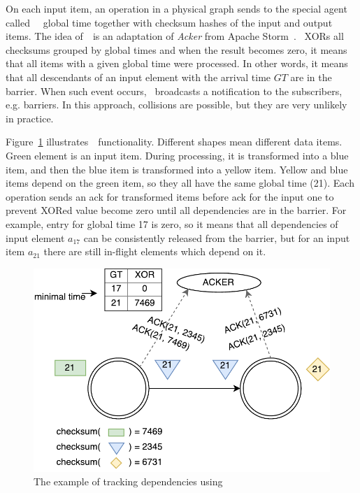 On each input item, an operation in a physical graph sends to the special agent called~{\em \Acker\ } global time together with checksum hashes of the input and output items. The idea of~\Acker\ is an adaptation of {\em Acker} from Apache Storm~\cite{apache:storm}. \Acker\ XORs all checksums grouped by global times and when the result becomes zero, it means that all items with a given global time were processed. In other words, it means that all descendants of an input element with the arrival time $GT$ are in the barrier. When such event occurs, \Acker\ broadcasts a notification to the subscribers, e.g. barriers. In this approach, collisions are possible, but they are very unlikely in practice.

Figure~\ref{acker} illustrates~\Acker\ functionality. Different shapes mean different data items. Green element is an input item. During processing, it is transformed into a blue item, and then the blue item is transformed into a yellow item. Yellow and blue items depend on the green item, so they all have the same global time (21). Each operation sends an ack for transformed items before ack for the input one to prevent XORed value become zero until all dependencies are in the barrier. For example, entry for global time 17 is zero, so it means that all dependencies of input element $a_{17}$ can be consistently released from the barrier, but for an input item $a_{21}$ there are still in-flight elements which depend on it.

\begin{figure}[htbp]
  \centering
  \includegraphics[scale=0.58]{pics/acker}
  \caption{The example of tracking dependencies using~\Acker\ }
  \label {acker}
\end{figure}

